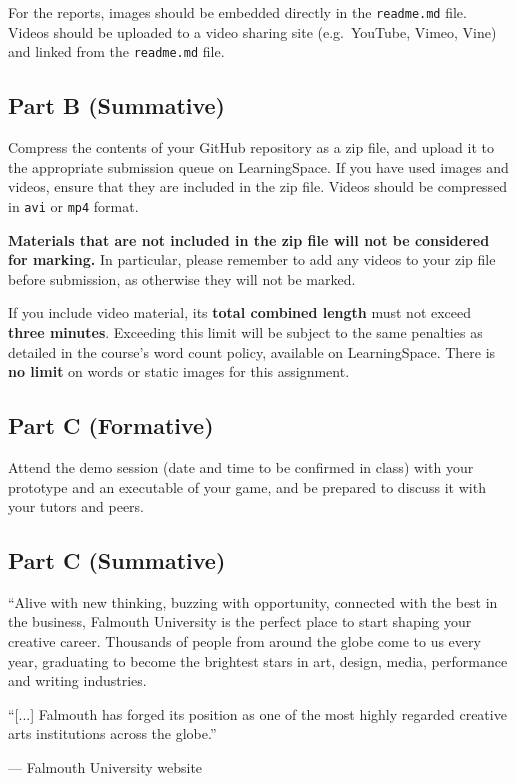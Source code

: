 \documentclass{../fal_assignment}
\begin{document}
For the reports, images should be embedded directly in the \texttt{readme.md} file.
Videos should be uploaded to a video sharing site (e.g.\ YouTube, Vimeo, Vine)
and linked from the \texttt{readme.md} file.

\subsection*{Part B (Summative)}

Compress the contents of your GitHub repository as a zip file,
and upload it to the appropriate submission queue on LearningSpace.
If you have used images and videos, ensure that they are included in the zip file.
Videos should be compressed in \texttt{avi} or \texttt{mp4} format.

\textbf{Materials that are not included in the zip file will not be considered for marking.}
In particular, please remember to add any videos to your zip file before submission,
as otherwise they will not be marked.

If you include video material, its \textbf{total combined length} must not exceed \textbf{three minutes}.
Exceeding this limit will be subject to the same penalties as detailed in the course's word count policy,
available on LearningSpace.
There is \textbf{no limit} on words or static images for this assignment.

\subsection*{Part C (Formative)}

Attend the demo session (date and time to be confirmed in class)
with your prototype and an executable of your game,
and be prepared to discuss it with your tutors and peers.

\subsection*{Part C (Summative)}




\begin{marginquote}
    ``Alive with new thinking, buzzing with opportunity, connected with the best in the business,
    Falmouth University is the perfect place to start shaping your creative career.
    Thousands of people from around the globe come to us every year,
    graduating to become the brightest stars in art, design, media, performance and writing industries.

    ``[...]
    Falmouth has forged its position as one of the most highly regarded creative arts institutions across the globe.''
    
    --- Falmouth University website
\end{marginquote}
\end{document}
